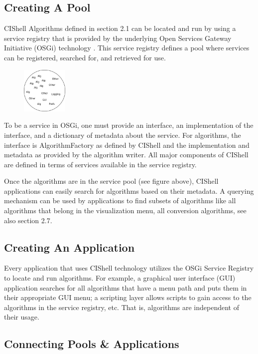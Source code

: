 \subsection{Creating A Pool}

CIShell Algorithms defined in section 2.1 can be located and run by using a 
service registry that is provided by the underlying Open Services Gateway 
Initiative (OSGi) technology \cite{osgi}. This service registry defines a pool 
where services can be registered, searched for, and retrieved for use.
\begin{figure} 
\includegraphics[width=22mm,height=22mm,clip=true]{graphics/algorithmPool.png} 
\end{figure} To be a service in OSGi, one must provide an interface, an 
implementation of the interface, and a dictionary of metadata about the 
service. For algorithms, the interface is AlgorithmFactory as defined by 
CIShell and the implementation and metadata as provided by the algorithm 
writer. All major components of CIShell are defined in terms of services 
available in the service registry.

Once the algorithms are in the service pool (see figure above), CIShell 
applications can easily search for algorithms based on their metadata. A 
querying mechanism can be used by applications to find subsets of algorithms 
like all algorithms that belong in the visualization menu, all conversion 
algorithms, see also section 2.7.

\subsection{Creating An Application}

Every application that uses CIShell technology utilizes the OSGi Service 
Registry to locate and run algorithms. For example, a graphical user interface 
(GUI) application searches for all algorithms that have a menu path and puts 
them in their appropriate GUI menu; a scripting layer allows scripts to gain 
access to the algorithms in the service registry, etc. That is, algorithms are 
independent of their usage.

\subsection{Connecting Pools \& Applications}

